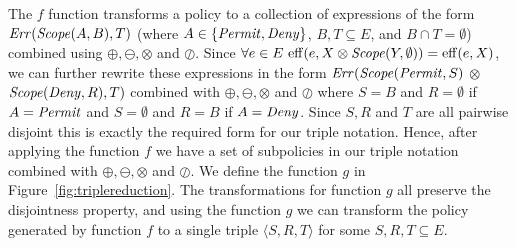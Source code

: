 The $f$ function transforms a policy to a collection of expressions of
the form $\text{\textit{Err}} (\text{\textit{Scope}} (A, B), T)$ (where $A \in \{ \text{\textit{Permit}}, \text{\textit{Deny}}
\}$, $B, T \subseteq E$, and $B \cap T = \emptyset$) combined using
$\oplus, \ominus, \otimes$ and $\oslash$.  Since $\forall e \in E \,
\operatorname{eff} (e, X \otimes \text{\textit{Scope}} (Y, \emptyset)) = \operatorname{eff} (e, X)$, we can
further rewrite these expressions in the form $\text{\textit{Err}} (\text{\textit{Scope}} (\text{\textit{Permit}},
S)$ $\otimes$ $\text{\textit{Scope}} (\text{\textit{Deny}}, R), T)$ combined with $\oplus, \ominus,
\otimes$ and $\oslash$ where $S = B$ and $R = \emptyset$ if $A =
\text{\textit{Permit}}$ and $S = \emptyset$ and $R = B$ if $A = \text{\textit{Deny}}$.  Since $S, R$
and $T$ are all pairwise disjoint this is exactly the required form
for our triple notation.  Hence, after applying the function $f$ we
have a set of subpolicies in our triple notation combined with
$\oplus, \ominus, \otimes$ and $\oslash$.  We define the function $g$
in Figure~\ref{fig:triplereduction}.  The transformations for function
$g$ all preserve the disjointness property, and using the function $g$
we can transform the policy generated by function $f$ to a single
triple $\langle S, R, T \rangle$ for some $S, R, T \subseteq E$.

